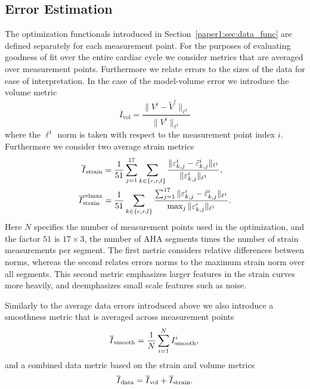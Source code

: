 \subsection{Error Estimation}

The optimization functionals introduced in Section~\ref{paper1:sec:data_func} are defined 
separately for each measurement
point. For the purposes of evaluating goodness of fit over the entire cardiac cycle
we consider metrics that are averaged over measurement points. Furthermore we 
relate errors to the sizes of the data 
for ease of interpretation. In the case of the model-volume error we introduce the volume metric
\begin{equation}
\overline{I}_{\text{vol}} = \frac{ \| V^i - \tilde{V}^i \|_{\ell^1}}{ \| V^i \|_{\ell^1}}
\label{paper1:eq:average_volume}
 \end{equation}
where the $\ell^1$ norm is taken with respect to the measurement point index $i$.
Furthermore we consider two average strain metrics
\begin{align}
\overline{I}_{\text{strain}} &= \frac{1}{51} \sum_{j= 1}^{17} \sum_{k \in \{c,r,l\}}
\frac{\| \varepsilon^i_{k,j} -  
\tilde{\varepsilon}^i_{k,j} \|_{\ell^1} }{ \| \varepsilon^i_{k,j} \|_{\ell^1}}, \\
\overline{I}^{\text{relmax}}_{\text{strain}} &=  \frac{1}{51} \sum_{k \in \{c,r,l\}}
 \frac{\sum_{j= 1}^{17} \| \varepsilon^i_{k,j} 
 -  \tilde{\varepsilon}^i_{k,j} \|_{\ell^1}}{ \max_j \| \varepsilon^i_{k,j} \|_{\ell^1}}.
\label{paper1:eq:average_strain}
\end{align}
Here $N$ specifies the number of measurement points used in the
optimization, and the factor $51$ is $17 \times 3$,
the number of AHA segments times the number of strain measurements per segment. 
The first metric considers relative differences between norms, whereas the second relates 
errors norms to the maximum
strain norm over all segments. This second metric emphasizes larger features in 
the strain curves more heavily, and deemphasizes
small scale features such as noise.

Similarly to the average data errors introduced above we also introduce a smoothness 
metric that is averaged across measurement points
\begin{equation}
\overline{I}_{\text{smooth}} = \frac{1}{N}\sum_{i = 1}^N I_{\text{smooth}}^i, \\
\end{equation}
and a combined data metric based on the strain and volume metrics
\begin{equation}
  \overline{I}_{\text{data}} = \overline{I}_{\text{vol}} + \overline{I}_{\text{strain}}.
\label{paper1:eq:total_functional}
\end{equation}


